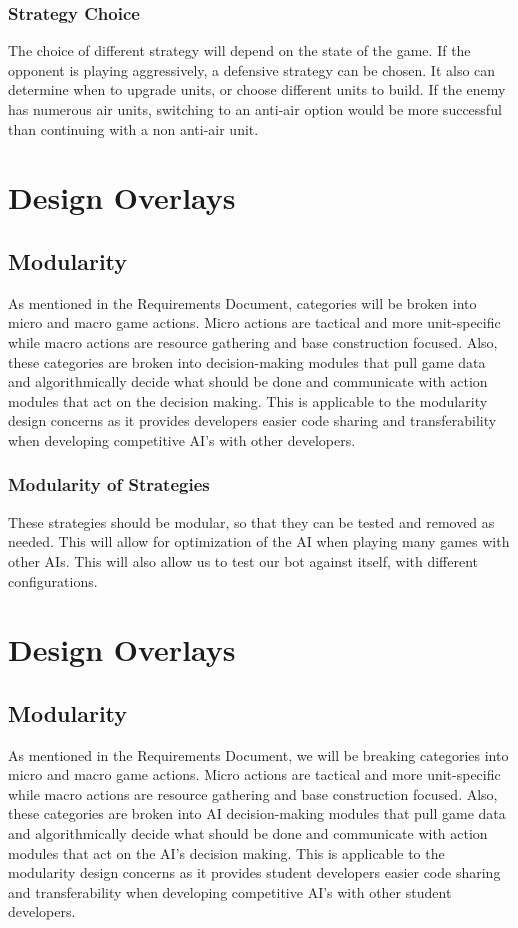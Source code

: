 \documentclass[10pt,letterpaper,onecolumn,draftclsnofoot]{IEEEtran}
\begin{document}
\subsubsection{Strategy Choice}
	The choice of different strategy will depend on the state of the game. If the opponent is playing aggressively, a defensive strategy can be chosen. It also can determine when to upgrade units, or choose different units to build. If the enemy has numerous air units, switching to an anti-air option would be more successful than continuing with a non anti-air unit. 

\section{Design Overlays}
\subsection{Modularity}
	As mentioned in the Requirements Document, categories will be broken into micro and macro game actions. Micro actions are tactical and more unit-specific while macro actions are resource gathering and base construction focused. Also, these categories are broken into decision-making modules that pull game data and algorithmically decide what should be done and communicate with action modules that act on the decision making. This is applicable to the modularity design concerns as it provides developers easier code sharing and transferability when developing competitive AI's with other developers. 
\subsubsection{Modularity of Strategies}
	These strategies should be modular, so that they can be tested and removed as needed. This will allow for optimization of the AI when playing many games with other AIs. This will also allow us to test our bot against itself, with different configurations.
\section{Design Overlays}
\subsection{Modularity}
	As mentioned in the Requirements Document, we will be breaking categories into micro and macro game actions. Micro actions are tactical and more unit-specific while macro actions are resource gathering and base construction focused. Also, these categories are broken into AI decision-making modules that pull game data and algorithmically decide what should be done and communicate with action modules that act on the AI's decision making. This is applicable to the modularity design concerns as it provides student developers easier code sharing and transferability when developing competitive AI's with other student developers. 
\end{document}
